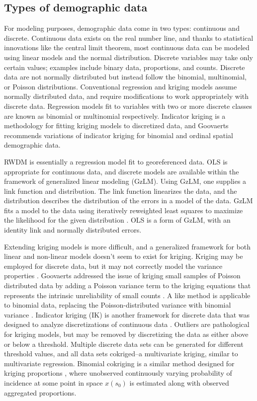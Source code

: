 \documentclass[]{interact}
\theoremstyle{plain}%
\theoremstyle{definition}
\theoremstyle{remark}
\begin{document}
\subsection{Types of demographic data}

For modeling purposes, demographic data come in two types: continuous and discrete.  Continuous data exists on the real number line, and thanks to statistical innovations like the central limit theorem, most continuous data can be modeled using linear models and the normal distribution.  Discrete variables may take only certain values; examples include binary data, proportions, and counts.  Discrete data are not normally distributed but instead follow the binomial, multinomial, or Poisson distributions.  Conventional regression and kriging models assume normally distributed data, and require modifications to work appropriately with discrete data.  Regression models fit to variables with two or more discrete classes are known as binomial or multinomial respectively.  Indicator kriging is a methodology for fitting kriging models to discretized data, and Goovaerts \cite{goovaerts10} recommends variations of indicator kriging for binomial and ordinal spatial demographic data.

RWDM is essentially a regression model fit to georeferenced data.  OLS is appropriate for continuous data, and discrete models are available within the framework of generalized linear modeling (GzLM).  Using GzLM, one supplies a link function and distribution.  The link function linearizes the data, and the distribution describes the distribution of the errors in a model of the data.  GzLM fits a model to the data using iteratively reweighted least squares to maximize the likelihood for the given distribution \citep{nelder72}.  OLS is a form of GzLM, with an identity link and normally distributed errors.  %

Extending kriging models is more difficult, and a generalized framework for both linear and non-linear models doesn't seem to exist for kriging.  Kriging may be employed for discrete data, but it may not correctly model the variance properties \citep{goovaerts10}.  Goovaerts addressed the issue of kriging small samples of Poisson distributed data by adding a Poisson variance term to the kriging equations that represents the intrinsic unreliability of small counts \citep{goovaerts06}.  A like method is applicable to binomial data, replacing the Poisson-distributed variance with binomial variance \citep{goovaerts04, goovaerts09}.  Indicator  kriging (IK) is another framework for discrete data that was designed to analyze discretizations of continuous data \citep{journel83}.  Outliers are pathological for kriging models, but may be removed by discretizing the data as either above or below a threshold.  Multiple discrete data sets can be generated for different threshold values, and all data sets cokriged--a multivariate kriging, similar to multivariate regression.  Binomial cokriging is a similar method designed for kriging proportions \citep{lajaunie91, oliver98}, where unobserved continuously varying probability of incidence at some point in space $x(s_0)$ is estimated along with observed aggregated proportions.
\end{document}
